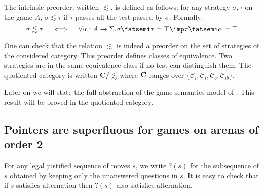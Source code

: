 The intrinsic preorder, written $\lesssim$, is defined as follows:
for any strategy $\sigma,\tau$ on the game $A$, $\sigma \lesssim
\tau$ if $\tau$ passes all the test passed by $\sigma$. Formally:
$$ \sigma \lesssim \tau \quad \iff \quad \forall \alpha : A \rightarrow \Sigma. \sigma \fatsemi \tau = \top \imp \tau \fatsemi \alpha = \top$$

One can check that the relation $\lesssim$ is indeed a preorder on
the set of strategies of the considered category. This preorder
defines classes of equivalence. Two strategies are in the same
equivalence class if no test can distinguish them. The quotiented
category is written $\bf C/\lesssim$ where $\bf C$ ranges over $\{
\mathcal{C}_i, \mathcal{C}_i, \mathcal{C}_b, \mathcal{C}_{ib} \}$.

Later on we will state the full abstraction of the game semantics model of \pcf. This result will
be proved in the quotiented category.

\subsection{Pointers are superfluous for games on arenas of order 2}

For any legal justified sequence of moves $s$, we write $?(s)$ for
the subsequence of $s$ obtained by keeping only the unanswered
questions in $s$. It is easy to check that if $s$ satisfies
alternation then $?(s)$ also satisfies alternation.

